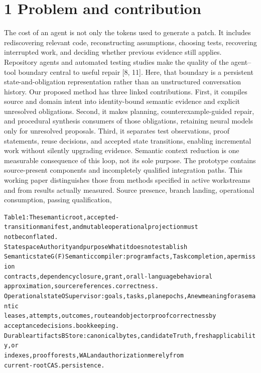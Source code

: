 

\section*{1 Problem and contribution}

The cost of an agent is not only the tokens used to generate a patch. It includes rediscovering
relevant code, reconstructing assumptions, choosing tests, recovering interrupted work, and deciding
whether previous evidence still applies. Repository agents and automated testing studies make the
quality of the agent–tool boundary central to useful repair [8, 11]. Here, that boundary is a persistent
state-and-obligation representation rather than an unstructured conversation history.
Our proposed method has three linked contributions. First, it compiles source and domain intent into
identity-bound semantic evidence and explicit unresolved obligations. Second, it makes planning,
counterexample-guided repair, and procedural synthesis consumers of those obligations, retaining
neural models only for unresolved proposals. Third, it separates test observations, proof statements,
reuse decisions, and accepted state transitions, enabling incremental work without silently upgrading
evidence. Semantic context reduction is one measurable consequence of this loop, not its sole
purpose.
The prototype contains source-present components and incompletely qualified integration paths. This
working paper distinguishes those from methods specified in active workstreams and from results
actually measured. Source presence, branch landing, operational consumption, passing qualification,

\begingroup\fontsize{7}{8.4}\selectfont
\begin{alltt}
Table 1: The semantic root, accepted-transition manifest, and mutable operational projection must
not be conflated.
State space               Authority and purpose                    What it does not establish
Semantic state G(F)       Semantic compiler: program facts,        Task completion, a permission
                          contracts, dependency closure,           grant, or all-language behavioral
                          approximation, source references.        correctness.
Operational state O       Supervisor: goals, tasks, plan epochs,   A new meaning for a semantic
                          leases, attempts, outcomes, route and    object or proof correctness by
                          acceptance decisions.                    bookkeeping.
Durable artifacts B       Store: canonical bytes, candidate        Truth, fresh applicability, or
                          indexes, proof forests, WAL and          authorization merely from
                          current-root CAS.                        persistence.
\end{alltt}\endgroup




